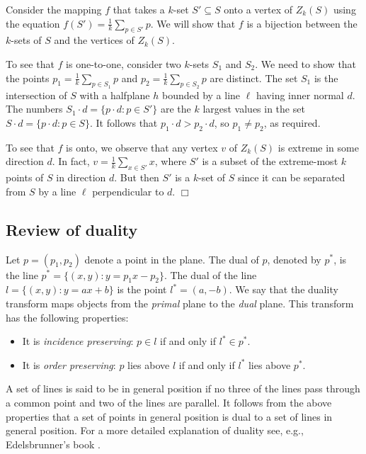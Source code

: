 \documentclass{elsart}
\newenvironment{proof}{{\bf Proof:} \rm}{\hfill $\Box$ \medskip\\}
\begin{document}
\begin{proof}
Consider the mapping $f$ that takes a $k$-set $S'\subseteq S$ onto a
vertex of $Z_k(S)$ using the equation $f(S')=\frac{1}{k}\sum_{p\in S'}
p$.  We will show that $f$ is a bijection between the $k$-sets of $S$ and
the vertices of $Z_k(S)$.

To see that $f$ is one-to-one, consider two $k$-sets $S_1$ and $S_2$.
We need to show that the points $p_1=\frac{1}{k}\sum_{p\in S_1}p$ and
$p_2=\frac{1}{k}\sum_{p\in S_2}p$ are distinct.  The set $S_1$ is the
intersection of $S$ with a halfplane $h$ bounded by a line $\ell$
having inner normal $d$.  The numbers $S_1\cdot d=\{p\cdot d:p\in
S'\}$ are the $k$ largest values in the set $S\cdot d=\{p\cdot
d:p\in S\}$.  It follows
that $p_1\cdot d
> p_2\cdot d$, so $p_1\neq p_2$, as required.

To see that $f$ is onto, we observe that any vertex $v$ of $Z_k(S)$ is
extreme in some direction $d$.  In fact, $v=\frac{1}{k}\sum_{x\in S'}
x$, where $S'$ is a subset of the extreme-most $k$ points of $S$ in
direction $d$.  But then $S'$ is a $k$-set of $S$ since it can be
separated from $S$ by a line $\ell$ perpendicular to $d$.
\end{proof}



\subsection{Review of duality}\label{subsection_review_of_duality}

Let $p = (p_1, p_2)$ denote a point in the plane. The dual of $p$,
denoted by $p^*$, is the line $p^* = \{(x,y) : y = p_1x -
p_2\}$. The dual of the line $l = \{(x,y) : y = ax + b\}$ is the point
$l^* = (a,-b)$.  
We say that the duality transform maps objects from the \emph{primal}
plane to the \emph{dual} plane. This transform has the following
properties:

\begin{itemize}
\item It is \emph{incidence preserving}: $p \in l$ if and only if $l^*
\in p^*$.

\item It is \emph{order preserving}: $p$ lies above $l$ if and only if $l^*$ lies above $p^*$.
\end{itemize}

A set of lines is said to be in general position if no three of the
lines pass through a common point and two of the lines are parallel.
It follows from the above properties that a set of points in general
position is dual to a set of lines in general position. For a more
detailed explanation of duality see, e.g., Edelsbrunner's book
\cite{edelsbrunner_book}.
\end{document}
